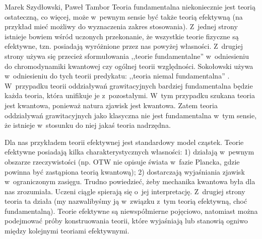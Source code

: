 \begin{artplenv2auth}{Marek Szydłowski, Paweł Tambor}
Teoria fundamentalna niekoniecznie jest teorią ostateczną, co więcej, może w~pewnym sensie być także teorią efektywną (na przykład mieć możliwy do wyznaczenia zakres stosowania). Z~jednej strony istnieje bowiem wśród uczonych przekonanie, że wszystkie teorie fizyczne są efektywne, tzn. posiadają wyróżnione przez nas powyżej własności. Z~drugiej strony używa się przecież sformułowania ,,teorie fundamentalne'' w~odniesieniu do chromodynamiki kwantowej czy ogólnej teorii względności. Sokołowski używa w~odniesieniu do tych teorii predykatu: ,,teoria niemal fundamentalna''
\parencite[][s.~122]{sokolowski_teorie_2006}. %
 W~przypadku teorii oddziaływań grawitacyjnych bardziej fundamentalna będzie każda teoria, która unifikuje je z~pozostałymi. W~tym przypadku szukana teoria jest kwantowa, ponieważ natura zjawisk jest kwantowa. Zatem teoria oddziaływań grawitacyjnych jako klasyczna nie jest fundamentalna w~tym sensie, że istnieje w~stosunku do niej jakaś teoria nadrzędna.

Dla nas przykładem teorii efektywnej jest standardowy model cząstek. Teorie efektywne posiadają kilka charakterystycznych własności: 1) działają w~pewnym obszarze rzeczywistości (np. OTW nie opisuje świata w~fazie Plancka, gdzie powinna być zastąpiona teorią kwantową); 2) dostarczają wyjaśniania zjawisk w~ograniczonym zasięgu. Trudno powiedzieć, żeby mechanika kwantowa była dla nas zrozumiała. Uczeni ciągle spierają się o~jej interpretację. Z~drugiej strony teoria ta działa (my nazwalibyśmy ją w~związku z~tym teorią efektywną, choć fundamentalną). Teorie efektywne są niewspółmierne pojęciowo, natomiast można podejmować próby konstruowania teorii, które wyjaśniają lub stanowią ogniwo między kolejnymi teoriami efektywnymi.


\end{artplenv2auth}
